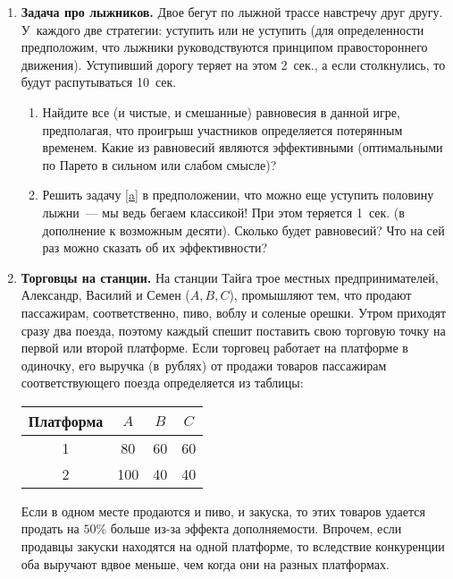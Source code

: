 \documentclass[a4paper,12pt]{article}
\begin{document}
\begin{enumerate}

\item {\bf Задача про лыжников.} Двое бегут по лыжной
трассе навстречу друг другу. У~каждого две стратегии:
уступить или не уступить (для определенности предположим,
что лыжники руководствуются принципом правостороннего
движения). Уступивший дорогу теряет на этом 2~сек., а если
столкнулись, то будут распутываться 10~сек.

\begin{enumerate}

\item\label{a} Найдите все (и чистые, и смешанные)
равновесия в данной игре, предполагая, что проигрыш
участников определяется потерянным временем. Какие из
равновесий являются эффективными (оптимальными по Парето в
сильном или слабом смысле)?

\item Решить задачу \ref{a} в предположении, что можно еще
уступить половину лыжни~--- мы ведь бегаем классикой! При
этом теряется 1~сек. (в дополнение к возможным десяти).
Сколько будет равновесий? Что на сей раз можно сказать об
их эффективности?

\end{enumerate}

\medskip

\item {\bf Торговцы на станции.} На станции Тайга трое
местных предпринимателей, Александр, Василий и Семен
($A,B,C$), промышляют тем, что продают пассажирам,
соответственно, пиво, воблу и соленые орешки. Утром
приходят сразу два поезда, поэтому каждый спешит поставить
свою торговую точку на первой или второй платформе. Если
торговец работает на платформе в одиночку, его выручка
(в~рублях) от продажи товаров пассажирам соответствующего
поезда определяется из таблицы:
\begin{center}
\begin{tabular}{|c|ccc|}
\hline Платформа&$A$&$B$&$C$\\ \hline 1&80&60&60\\ 2&100&40&40\\
\hline
\end{tabular}
\end{center}
Если в одном месте продаются и пиво, и закуска, то этих
товаров удается продать на $50\%$ больше из-за эффекта
дополняемости. Впрочем, если продавцы закуски находятся на
одной платформе, то вследствие конкуренции оба выручают
вдвое меньше, чем когда они на разных платформах.
\begin{enumerate}


\end{enumerate}
\end{enumerate}
\end{document}
